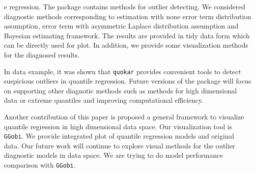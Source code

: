 \documentclass[11pt,a4paper,]{article}
\theoremstyle{definition}
\theoremstyle{definition}
\theoremstyle{remark}
\begin{document}
e regression. The package contains methods
for outlier detecting. We considered diagnostic methods corresponding to
estimation with none error term distribution assumption, error term with
asymmetric Laplace distribution assumption and Bayesian estimating
framework. The results are provided in tidy data form which can be
directly used for plot. In addition, we provide some visualization
methods for the diagnosed results.

In data example, it was shown that \texttt{quokar} provides convenient
tools to detect suspicious outliers in quantile regression. Future
versions of the package will focus on supporting other diagnotic methods
such as methods for high dimensional data or extreme quantiles and
improving computational efficiency.

Another contribution of this paper is proposed a general framework to
visualize quantile regression in high dimensional data space. Our
visualization tool is \texttt{GGobi}. We provide integrated plot of
quantile regression models and original data. Our future work will
continue to explore visual methods for the outlier diagnostic models in
data space. We are trying to do model performance comparison with
\texttt{GGobi}.

\printbibliography
\end{document}
